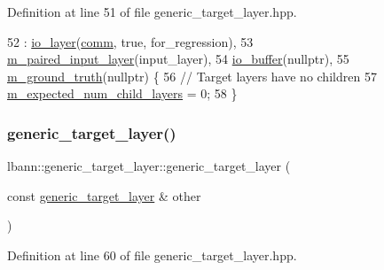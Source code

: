 Definition at line 51 of file generic\+\_\+target\+\_\+layer.\+hpp.


\begin{DoxyCode}
52     : \hyperlink{classlbann_1_1io__layer_ab2b5002dfeb0806062ecf3d9fefb9948}{io\_layer}(\hyperlink{file__io_8cpp_ab048c6f9fcbcfaa57ce68b00263dbebe}{comm}, \textcolor{keyword}{true}, for\_regression),
53       \hyperlink{classlbann_1_1generic__target__layer_a84da1260e9feb4fbc3e6f2315e4cab4b}{m\_paired\_input\_layer}(input\_layer),
54       \hyperlink{classlbann_1_1generic__target__layer_a8da650b94f50cc63fc90cd792fa50c3f}{io\_buffer}(\textcolor{keyword}{nullptr}),
55       \hyperlink{classlbann_1_1generic__target__layer_acb9ba351caf22b8e2378e4cd1e256da7}{m\_ground\_truth}(\textcolor{keyword}{nullptr}) \{
56     \textcolor{comment}{// Target layers have no children}
57     \hyperlink{classlbann_1_1Layer_ac08f133dddd150319650e220ab9a523a}{m\_expected\_num\_child\_layers} = 0;
58   \}
\end{DoxyCode}
\mbox{\label{classlbann_1_1generic__target__layer_a72f03053d39d371281339ae57e85f9aa}} 
\subsubsection{\texorpdfstring{generic\+\_\+target\+\_\+layer()}{generic\_target\_layer()}\hspace{0.1cm}{\footnotesize\ttfamily [2/2]}}
{\footnotesize\ttfamily lbann\+::generic\+\_\+target\+\_\+layer\+::generic\+\_\+target\+\_\+layer (\begin{DoxyParamCaption}\item[{const \hyperlink{classlbann_1_1generic__target__layer}{generic\+\_\+target\+\_\+layer} \&}]{other }\end{DoxyParamCaption})\hspace{0.3cm}{\ttfamily [inline]}}



Definition at line 60 of file generic\+\_\+target\+\_\+layer.\+hpp.


